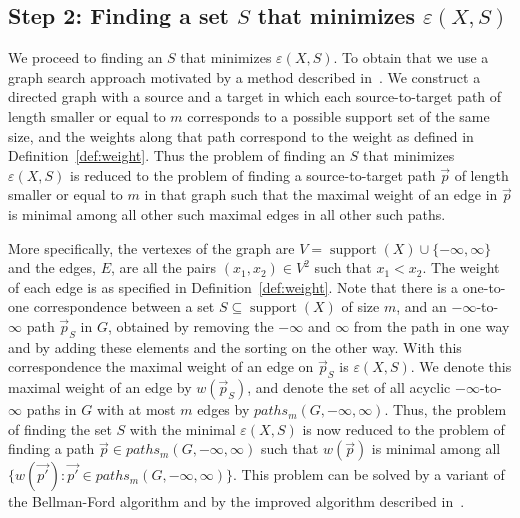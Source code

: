 \documentclass{article}
\newtheorem{corollary}[thm]{Corollary}
\DeclareMathOperator{\support}{support}
\begin{document}
	
	
	\subsection*{Step 2: Finding a set $S$ that minimizes $\varepsilon(X,S)$}
	
	We proceed to finding an $S$ that minimizes $\varepsilon(X,S)$. To obtain that we use a graph search approach motivated by a method described in~\cite{chakravarty1982partitioning}. We construct a directed graph with a source and a target in which each source-to-target path of length smaller or equal to $m$ corresponds to a possible support set of the same size, and the weights along that path correspond to the weight as defined in Definition~\ref{def:weight}. Thus the problem of finding an $S$ that minimizes $\varepsilon(X,S)$ is reduced to the problem of finding a source-to-target path $\vec{p}$ of length smaller or equal to $m$ in that graph such that the maximal weight of an edge in $\vec{p}$ is minimal among all other such maximal edges in all other such paths. 
	
	
	More specifically, the vertexes of the graph are $V=\support(X) \cup \{-\infty,\infty\}$ and the edges, $E$, are all the pairs $(x_1,x_2) \in V^2$ such that $x_1 < x_2$. The weight 
	of each edge is as specified in Definition~\ref{def:weight}. Note that there is a one-to-one correspondence between a set $S \subseteq \support(X)$ of size $m$, and an $-\infty$-to-$\infty$ path $\vec{p}_S$ in $G$, obtained by removing the $-\infty$ and $\infty$ from the path in one way and by adding these elements and the sorting on the other way. 
	With this correspondence the maximal weight of an edge on $\vec{p}_S$ is $\varepsilon(X,S)$. We denote this maximal weight of an edge  by $w(\vec{p}_S)$, and denote the set of all acyclic $-\infty$-to-$\infty$ paths in $G$ with at most $m$ edges by $paths_m(G, -\infty, \infty)$. Thus, the problem of finding the set $S$ with the minimal  $\varepsilon(X,S)$ is now reduced to the problem of finding a path $\vec{p}\in paths_m(G, -\infty, \infty)$ such that $w(\vec{p})$ is minimal among all $\{w(\vec{p'}) \colon \vec{p'}\in paths_m(G, -\infty, \infty)\}$. 
	This problem can be solved by a variant of the Bellman-Ford algorithm and by the improved algorithm described in~\cite{guerin2002computing}.
	
	
	
\end{document}
